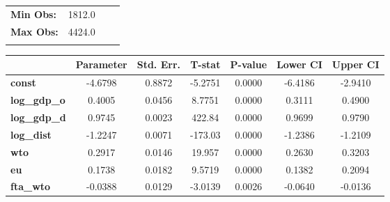 \documentclass{article}
\begin{document}
\begin{center}
\begin{tabular}{lclc}
\textbf{Min Obs:}          &       1812.0       & \textbf{                     }   &                  \\
\textbf{Max Obs:}          &       4424.0       & \textbf{                     }   &                  \\
\textbf{}                  &                    & \textbf{                     }   &                  \\
\bottomrule
\end{tabular}
\begin{tabular}{lcccccc}
                     & \textbf{Parameter} & \textbf{Std. Err.} & \textbf{T-stat} & \textbf{P-value} & \textbf{Lower CI} & \textbf{Upper CI}  \\
\midrule
\textbf{const}       &      -4.6798       &       0.8872       &     -5.2751     &      0.0000      &      -6.4186      &      -2.9410       \\
\textbf{log\_gdp\_o} &       0.4005       &       0.0456       &      8.7751     &      0.0000      &       0.3111      &       0.4900       \\
\textbf{log\_gdp\_d} &       0.9745       &       0.0023       &      422.84     &      0.0000      &       0.9699      &       0.9790       \\
\textbf{log\_dist}   &      -1.2247       &       0.0071       &     -173.03     &      0.0000      &      -1.2386      &      -1.2109       \\
\textbf{wto}         &       0.2917       &       0.0146       &      19.957     &      0.0000      &       0.2630      &       0.3203       \\
\textbf{eu}          &       0.1738       &       0.0182       &      9.5719     &      0.0000      &       0.1382      &       0.2094       \\
\textbf{fta\_wto}    &      -0.0388       &       0.0129       &     -3.0139     &      0.0026      &      -0.0640      &      -0.0136       \\
\bottomrule
\end{tabular}
\end{center}
\end{document}
